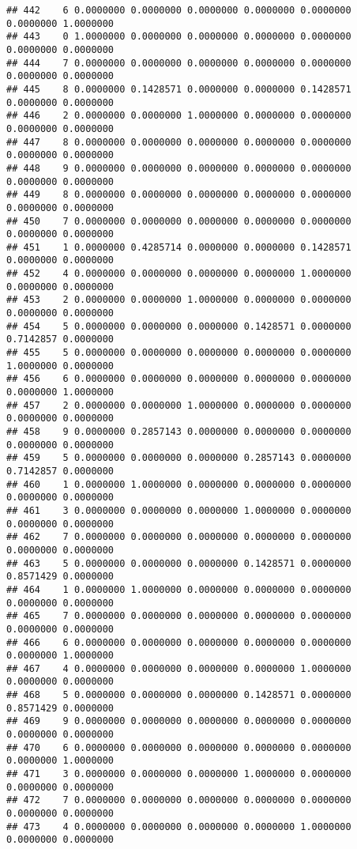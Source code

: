 \documentclass[
]{article}
\begin{document}
\begin{verbatim}
## 442    6 0.0000000 0.0000000 0.0000000 0.0000000 0.0000000 0.0000000 1.0000000
## 443    0 1.0000000 0.0000000 0.0000000 0.0000000 0.0000000 0.0000000 0.0000000
## 444    7 0.0000000 0.0000000 0.0000000 0.0000000 0.0000000 0.0000000 0.0000000
## 445    8 0.0000000 0.1428571 0.0000000 0.0000000 0.1428571 0.0000000 0.0000000
## 446    2 0.0000000 0.0000000 1.0000000 0.0000000 0.0000000 0.0000000 0.0000000
## 447    8 0.0000000 0.0000000 0.0000000 0.0000000 0.0000000 0.0000000 0.0000000
## 448    9 0.0000000 0.0000000 0.0000000 0.0000000 0.0000000 0.0000000 0.0000000
## 449    8 0.0000000 0.0000000 0.0000000 0.0000000 0.0000000 0.0000000 0.0000000
## 450    7 0.0000000 0.0000000 0.0000000 0.0000000 0.0000000 0.0000000 0.0000000
## 451    1 0.0000000 0.4285714 0.0000000 0.0000000 0.1428571 0.0000000 0.0000000
## 452    4 0.0000000 0.0000000 0.0000000 0.0000000 1.0000000 0.0000000 0.0000000
## 453    2 0.0000000 0.0000000 1.0000000 0.0000000 0.0000000 0.0000000 0.0000000
## 454    5 0.0000000 0.0000000 0.0000000 0.1428571 0.0000000 0.7142857 0.0000000
## 455    5 0.0000000 0.0000000 0.0000000 0.0000000 0.0000000 1.0000000 0.0000000
## 456    6 0.0000000 0.0000000 0.0000000 0.0000000 0.0000000 0.0000000 1.0000000
## 457    2 0.0000000 0.0000000 1.0000000 0.0000000 0.0000000 0.0000000 0.0000000
## 458    9 0.0000000 0.2857143 0.0000000 0.0000000 0.0000000 0.0000000 0.0000000
## 459    5 0.0000000 0.0000000 0.0000000 0.2857143 0.0000000 0.7142857 0.0000000
## 460    1 0.0000000 1.0000000 0.0000000 0.0000000 0.0000000 0.0000000 0.0000000
## 461    3 0.0000000 0.0000000 0.0000000 1.0000000 0.0000000 0.0000000 0.0000000
## 462    7 0.0000000 0.0000000 0.0000000 0.0000000 0.0000000 0.0000000 0.0000000
## 463    5 0.0000000 0.0000000 0.0000000 0.1428571 0.0000000 0.8571429 0.0000000
## 464    1 0.0000000 1.0000000 0.0000000 0.0000000 0.0000000 0.0000000 0.0000000
## 465    7 0.0000000 0.0000000 0.0000000 0.0000000 0.0000000 0.0000000 0.0000000
## 466    6 0.0000000 0.0000000 0.0000000 0.0000000 0.0000000 0.0000000 1.0000000
## 467    4 0.0000000 0.0000000 0.0000000 0.0000000 1.0000000 0.0000000 0.0000000
## 468    5 0.0000000 0.0000000 0.0000000 0.1428571 0.0000000 0.8571429 0.0000000
## 469    9 0.0000000 0.0000000 0.0000000 0.0000000 0.0000000 0.0000000 0.0000000
## 470    6 0.0000000 0.0000000 0.0000000 0.0000000 0.0000000 0.0000000 1.0000000
## 471    3 0.0000000 0.0000000 0.0000000 1.0000000 0.0000000 0.0000000 0.0000000
## 472    7 0.0000000 0.0000000 0.0000000 0.0000000 0.0000000 0.0000000 0.0000000
## 473    4 0.0000000 0.0000000 0.0000000 0.0000000 1.0000000 0.0000000 0.0000000

\end{verbatim}
\end{document}
